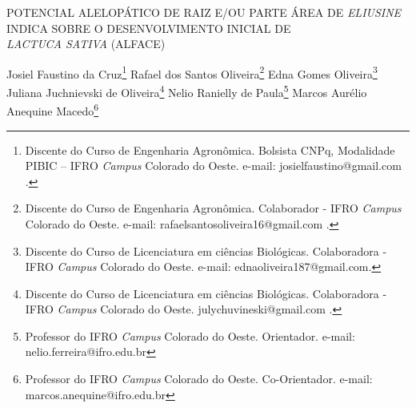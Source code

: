 \documentclass[article,12pt,onesidea,4paper,english,brazil]{abntex2}
\begin{document}
	
	
	\frenchspacing 
	
	\begin{center}
		\LARGE POTENCIAL ALELOPÁTICO DE RAIZ E/OU PARTE ÁREA DE \textit{ELIUSINE} INDICA SOBRE O DESENVOLVIMENTO INICIAL DE\\ \textit{LACTUCA SATIVA} (ALFACE)
		
		\normalsize
		Josiel Faustino da Cruz\footnote{Discente do Curso de Engenharia Agronômica. Bolsista CNPq, Modalidade PIBIC – IFRO \textit{Campus} Colorado do Oeste. e-mail: josielfaustino@gmail.com .} 
		Rafael dos Santos Oliveira\footnote{Discente do Curso de Engenharia Agronômica. Colaborador - IFRO \textit{Campus} Colorado do Oeste. e-mail: rafaelsantosoliveira16@gmail.com .} 
		Edna Gomes Oliveira\footnote{Discente do Curso de Licenciatura em ciências Biológicas. Colaboradora - IFRO \textit{Campus} Colorado do Oeste. e-mail: ednaoliveira187@gmail.com.} \\
		Juliana Juchnievski de Oliveira\footnote{Discente do Curso de Licenciatura em ciências Biológicas. Colaboradora - IFRO \textit{Campus} Colorado do Oeste. julychuvineski@gmail.com .}
		Nelio Ranielly de Paula\footnote{Professor do IFRO \textit{Campus} Colorado do Oeste. Orientador. e-mail: nelio.ferreira@ifro.edu.br}
		Marcos Aurélio Anequine Macedo\footnote{Professor do IFRO \textit{Campus} Colorado do Oeste. Co-Orientador. e-mail: marcos.anequine@ifro.edu.br}
		 
	\end{center}
	
\end{document}
